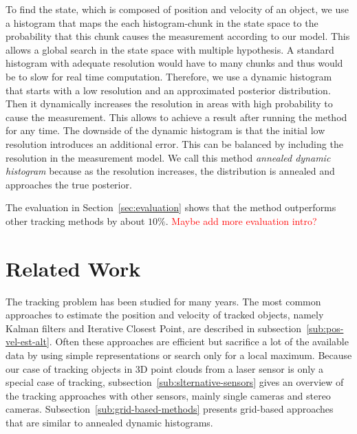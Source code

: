\documentclass[twoside,a4paper,article]{combine}
\begin{document}
To find the state, which is composed of position and velocity of an
object, we use a histogram that maps the each histogram-chunk in the
state space to the probability that this chunk causes the measurement
according to our model. This allows a global search in the state space
with multiple hypothesis. A standard histogram with adequate
resolution would have to many chunks and thus would be to slow for
real time computation. Therefore, we use a dynamic histogram that
starts with a low resolution and an approximated posterior
distribution. Then it dynamically increases the resolution in areas
with high probability to cause the measurement. This allows to achieve
a result after running the method for any time. The downside of the
dynamic histogram is that the initial low resolution introduces an
additional error. This can be balanced by including the resolution in
the measurement model. We call this method \textit{annealed dynamic
  histogram} because as the resolution increases, the distribution is
annealed and approaches the true posterior.

The evaluation in Section~\ref{sec:evaluation} shows that the method
outperforms other tracking methods by about $10\%$.
\textcolor{red}{Maybe add more evaluation intro?}

\section{Related Work}
\label{sec:related-work}
The tracking problem has been studied for many years. The most common
approaches to estimate the position and velocity of tracked objects,
namely Kalman filters and Iterative Closest Point,
are described in subsection~\ref{sub:pos-vel-est-alt}. Often these
approaches are efficient but sacrifice a lot of the available data by
using simple representations or search only for a local maximum.
Because
our case of tracking objects in 3D point clouds from a laser sensor is
only a special case of tracking,
subsection~\ref{sub:slternative-sensors} gives an overview of the
tracking approaches with other sensors, mainly single cameras and
stereo cameras.
Subsection~\ref{sub:grid-based-methods} presents
grid-based approaches that are similar to annealed dynamic histograms.
\end{document}
